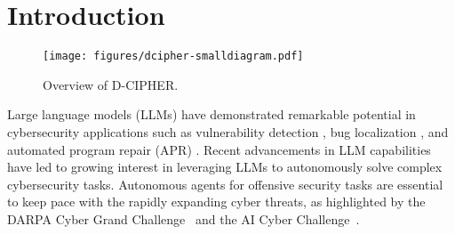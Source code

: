 \section{Introduction}

\begin{figure}[tpb]
    \centering
    \texttt{[image: figures/dcipher-smalldiagram.pdf]}
    \caption{Overview of D-CIPHER.}
    \label{fig:overview}
\end{figure}

Large language models (LLMs) have demonstrated remarkable potential in cybersecurity applications such as vulnerability detection 
\cite{lu2024grace, guo2024outside, akuthota2023vulnerability, li2024llm}, bug localization \cite{li2024attention, zhang2024empirical}, and automated program repair (APR) \cite{bouzenia2024repairagent, xia2023conversational, xia2024automated}.
Recent advancements in LLM capabilities have led to growing interest in leveraging LLMs to autonomously solve complex cybersecurity tasks.
Autonomous agents for offensive security tasks are essential to keep pace with the rapidly expanding cyber threats, as highlighted by the DARPA Cyber Grand Challenge~\cite{DARPA-CGC} and the AI Cyber Challenge~\cite{DARPA-AIxCC}.
